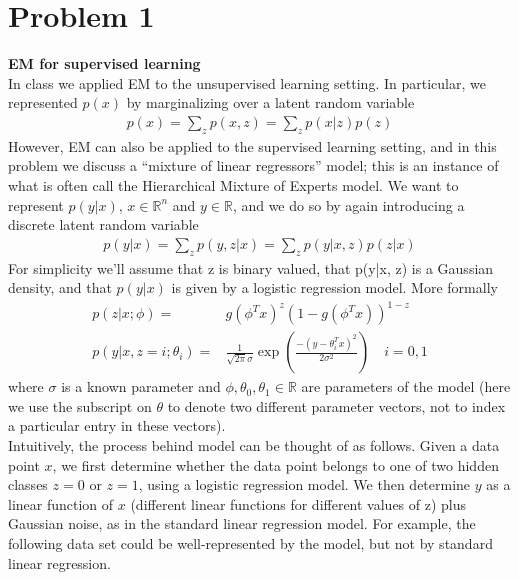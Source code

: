 \documentclass{article}
\title{Problem Set #4:  Unsupervised Learning and Reinforcement Learning}
\author{Eitan Joseph \and Caroline Wang}
\date{\today}
\begin{document}
\maketitle

\section*{Problem 1}
\textbf{EM for supervised learning}\\
In class we applied EM to the unsupervised learning setting. In particular, we represented $p(x)$ by marginalizing over a latent random variable \begin{align*}
    p(x) = \sum_{z} p(x,z) = \sum_{z} p(x|z)p(z)
\end{align*}
However, EM can also be applied to the supervised learning setting, and in this problem we discuss a “mixture of linear regressors” model; this is an instance of what is often call the Hierarchical Mixture of Experts model. We want to represent $p(y|x)$, $x\in \mathbb{R}^n$ and $y\in\mathbb{R}$, and we do so by again introducing a discrete latent random variable
\begin{align*}
    p(y|x) = \sum_z p(y,z|x) = \sum_{z} p(y|x,z) p(z|x) 
\end{align*}
For simplicity we’ll assume that z is binary valued, that p(y|x, z) is a Gaussian density, and that $p(y|x)$ is given by a logistic regression model. More formally
\begin{align*}
    p(z|x;\phi ) =& g(\phi^Tx)^z(1-g(\phi^Tx))^{1-z}\\
    p(y|x,z = i; \theta_i) = &\frac{1}{\sqrt{2\pi}\sigma}\exp\left(\frac{-(y-\theta_i^Tx)^2}{2\sigma^2}\right)\quad i = 0,1
\end{align*}where $\sigma$ is a known parameter and $\phi, \theta_0, \theta_1 \in \mathbb{R}$ are parameters of the model (here we use the subscript on $\theta $ to denote two different parameter vectors, not to index a particular entry in these vectors).\\
Intuitively, the process behind model can be thought of as follows. Given a data point $x$, we first determine whether the data point belongs to one of two hidden classes $z=0$ or $z = 1$, using a logistic regression model. We then determine $y$ as a linear function of $x$ (different linear functions for different values of z) plus Gaussian noise, as in the standard
linear regression model. For example, the following data set could be well-represented by the model, but not by standard linear regression.
\end{document}
